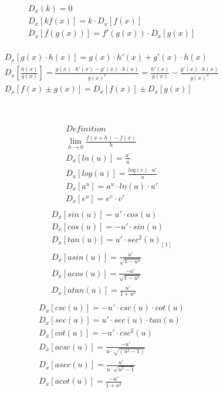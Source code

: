 \documentclass[fleqn]{article}
\begin{document}
\begin{vwcol}[widths={0.3,0.6}, sep=.5cm, justify=flush,rule=2pt,indent=0em] 
    \begin{align*}
        &D_x(k) = 0 \\
        &D_x[kf(x)] = k \cdot D_x[f(x)] \\
        &D_x[f(g(x))] = f'(g(x)) \cdot D_x[g(x)]
    \end{align*}

    \begin{align*}
        \\&D_x[g(x)\cdot h(x)] = g(x)\cdot h'(x) + g'(x) \cdot h(x) \\
        &D_x\left[\frac{h(x)}{g(x)}\right] =  \frac{g(x)\cdot h'(x) - g'(x)\cdot h(x)}{g(x)^2}=\frac{h'(x)}{g(x)}-\frac{g'(x)\cdot h(x)}{g(x)^2}               \\
        &D_x[f(x) \pm g(x)] = D_x[f(x)] \pm D_x[g(x)]
    \end{align*}
\end{vwcol}

\textbf{\\}
%
\begin{vwcol}[widths={0.2,1.6,0.6}, sep=.5cm, justify=flush,rule=2pt,indent=0em] 
\begin{align*}
    &Definition\\
    &\lim_{{h \to 0}} \frac{f(x+h) - f(x)}{h}\\
    &D_x[ln(u)] = \frac{u'}{u} \\
    &D_x[log(u)] = \frac{log(e) \cdot u'}{u} \\
    &D_x[a^u] = a^u \cdot ln(a) \cdot u' \\
    &D_x[e^u]=e^v\cdot v'
\end{align*}
\begin{align*}
    \\&D_x[sin(u)] = u'\cdot cos(u)
    \\&D_x[cos(u)] = -u'\cdot sin(u)
    \\&D_x[tan(u)] = u'\cdot sec^2(u)_{[1]}
    \\&D_x[asin(u)] = \frac{u'}{\sqrt{1-u^2}}
    \\&D_x[acos(u)] = \frac{-u'}{\sqrt{1-u^2}}
    \\&D_x[atan(u)] = \frac{u'}{1+u^2}
\end{align*}
\begin{align*}
    \\&D_x[csc(u)] = -u'\cdot csc(u) \cdot cot(u)
    \\&D_x[sec(u)] = u'\cdot sec(u) \cdot tan(u)
    \\&D_x[cot(u)] = -u'\cdot csc^2(u)
    \\&D_x[acsc(u)] = \frac{-u'}{u\cdot \sqrt{(u^2-1)}}
    \\&D_x[asec(u)] = \frac{u'}{u\cdot \sqrt{u^2-1}}
    \\&D_x[acot(u)] = \frac{-u'}{1+u^2}
\end{align*}
\end{vwcol}
\end{document}
